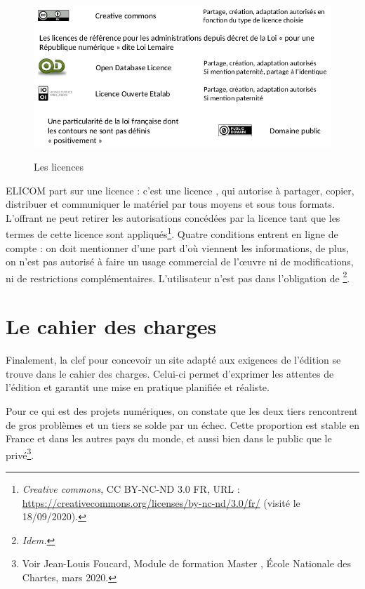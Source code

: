 \begin{figure}[ht]
    \centering
    \caption{Les licences}
    \includegraphics[width=16cm]{images/licences.png}
    \label{licences}
\end{figure}

ELICOM part sur une licence  : c'est une licence , qui autorise à partager, copier, distribuer et communiquer le matériel par tous moyens et sous tous formats. L'offrant ne peut retirer les autorisations concédées par la licence tant que les termes de cette licence sont appliqués\footnote{\emph{Creative commons}, CC BY-NC-ND 3.0 FR, URL : \url{https://creativecommons.org/licenses/by-nc-nd/3.0/fr/} (visité le 18/09/2020).}. Quatre conditions entrent en ligne de compte : on doit mentionner d'une part d'où viennent les informations, de plus, on n'est pas  autorisé à faire un usage commercial de l'\oe uvre ni de modifications, ni de restrictions complémentaires.
L'utilisateur n'est pas dans l'obligation de \footnote{\emph{Idem.}}.

\section{Le cahier des charges}

Finalement, la clef pour concevoir un site adapté aux exigences de l'édition se trouve dans le cahier des charges.
Celui-ci permet d'exprimer les attentes de l'édition et garantit une mise en pratique planifiée et réaliste. 

Pour ce qui est des projets numériques, on constate que les deux tiers rencontrent de gros problèmes et un tiers se solde par un échec. Cette proportion est stable en France et dans les autres pays du monde, et aussi bien dans le public que le privé\footnote{Voir Jean-Louis Foucard, Module de formation
 Master , École Nationale des Chartes, mars 2020.}.


